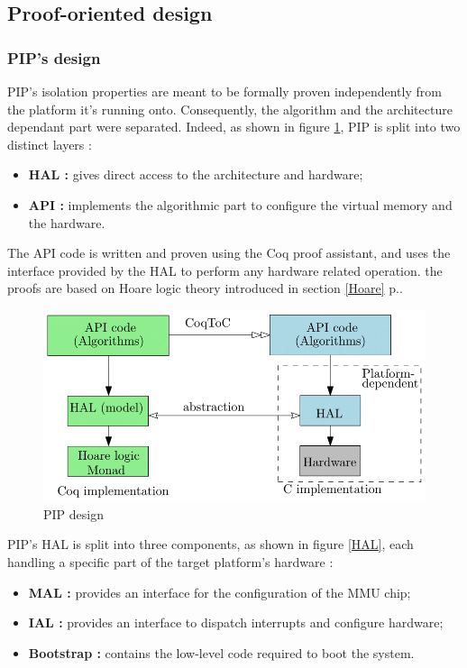 \subsection{Proof-oriented design}

\subsubsection{PIP's design} 
PIP's isolation properties are meant to be formally proven independently from the platform it's running onto. Consequently, the algorithm and the architecture dependant part were separated. Indeed, as shown in figure \ref{design}, PIP is split into two distinct layers  :
\begin{itemize}
	\item \textbf{HAL :} gives direct access to the architecture and hardware;
	\item \textbf{API :} implements the algorithmic part to configure the virtual memory and the hardware.
\end{itemize}

\noindent The API code is written and proven using the Coq proof assistant, and uses the interface provided by the HAL to perform any hardware related operation. the proofs are based on Hoare logic theory introduced in section \ref{Hoare} p.\pageref{Hoare}.

\begin{figure}[!ht]  
	\centering 
	\includegraphics[width=0.8\linewidth, frame]{img/PIPDesign.png} 
	\caption{PIP design}
	\label{design}
\end{figure}

\noindent PIP's HAL is split into three components, as shown in figure \ref{HAL}, each handling a specific part of the target platform's hardware :
\begin{itemize}
	\item \textbf{\gls{MAL} :} provides an interface for the configuration of the MMU chip;
	\item \textbf{\gls{IAL} :} provides an interface to dispatch interrupts and configure hardware;
	\item \textbf{Bootstrap :} contains the low-level code required to boot the system.
\end{itemize}

